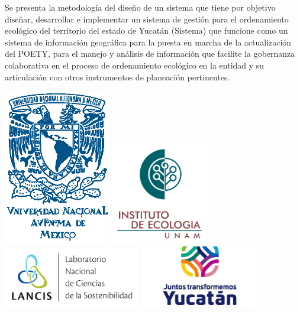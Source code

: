 \begin{titlepage}
\begin{minipage}[t]{0.6\textwidth}
Se presenta la metodología del diseño de un sistema que tiene por objetivo diseñar, desarrollar e implementar un sistema de gestión para el ordenamiento ecológico del territorio del estado de Yucatán (Sistema) que funcione como un sistema de información geográfica para la puesta en marcha de la actualización del POETY, para el manejo y análisis  de información que facilite la gobernanza colaborativa en el proceso de ordenamiento ecológico en la entidad y su articulación con otros instrumentos de planeación pertinentes.
\end{minipage}%
\hfill
\begin{minipage}[t]{0.25\textwidth} 
  \includegraphics[width=47mm]{images/UNAM}\vspace{2cm}
  \includegraphics[width=42mm]{images/ie_logo}\vspace{2cm}
  \includegraphics[width=60mm]{images/lancis_logo}\vspace{2cm}
  \includegraphics[width=52mm]{images/yucatan_logo}%
\end{minipage}

\end{titlepage}

\pagebreak

\restoregeometry